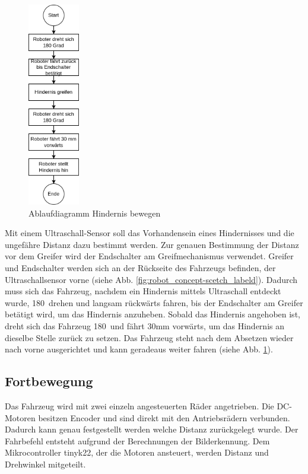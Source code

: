 \begin{figure}[H]
\centering
\includegraphics[width=0.2\textwidth]{assets/gesamtkonzept/ablaufdiagramm-hindernis-bewegen.png}
\caption{Ablaufdiagramm Hindernis bewegen}
\label{fig:ablaufdiagramm-hindernis-bewegen}
\end{figure}

 Mit einem Ultraschall-Sensor soll das Vorhandensein eines Hindernisses und die ungefähre Distanz dazu bestimmt werden. Zur genauen Bestimmung der Distanz vor dem Greifer wird der Endschalter am Greifmechanismus verwendet.
Greifer und Endschalter werden sich an der Rückseite des Fahrzeugs befinden, der Ultraschallsensor vorne (siehe Abb. \ref{fig:robot_concept-scetch_labeld}). Dadurch muss sich das Fahrzeug, nachdem ein Hindernis mittels Ultraschall entdeckt wurde, 180\textdegree\ drehen und langsam rückwärts fahren, bis der Endschalter am Greifer betätigt wird, um das Hindernis anzuheben. Sobald das Hindernis angehoben ist, dreht sich das Fahrzeug 180\textdegree\ und fährt 30mm vorwärts, um das Hindernis an dieselbe Stelle zurück zu setzen. Das Fahrzeug steht nach dem Absetzen wieder nach vorne ausgerichtet und kann geradeaus weiter fahren (siehe  Abb. \ref{fig:ablaufdiagramm-hindernis-bewegen}).


\subsection{Fortbewegung}

Das Fahrzeug wird mit zwei einzeln angesteuerten Räder angetrieben. Die DC-Motoren besitzen Encoder und sind direkt mit den Antriebsrädern verbunden.  Dadurch kann genau festgestellt werden welche Distanz zurückgelegt wurde. Der Fahrbefehl entsteht aufgrund der Berechnungen der Bilderkennung. Dem Mikrocontroller \acrshort{tinyk22}, der die Motoren ansteuert,  werden Distanz und Drehwinkel mitgeteilt.

